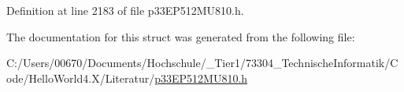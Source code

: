 Definition at line 2183 of file p33\+E\+P512\+M\+U810.\+h.



The documentation for this struct was generated from the following file\+:\begin{DoxyCompactItemize}
\item 
C\+:/\+Users/00670/\+Documents/\+Hochschule/\+\_\+\+Tier1/73304\+\_\+\+Technische\+Informatik/\+Code/\+Hello\+World4.\+X/\+Literatur/\hyperlink{p33_e_p512_m_u810_8h}{p33\+E\+P512\+M\+U810.\+h}\end{DoxyCompactItemize}
